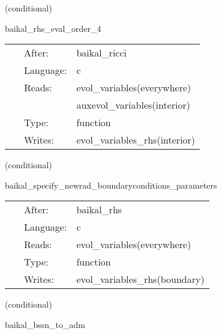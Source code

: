    (conditional) 

\hspace{5mm} baikal\_rhs\_eval\_order\_4 

\hspace{5mm}{\it evaluate bssn rhss, at finite-differencing order 4 } 


\hspace{5mm}

 \begin{tabular*}{160mm}{cll} 
~ & After:  & baikal\_ricci \\ 
~ & Language:  & c \\ 
~ & Reads:  & evol\_variables(everywhere) \\ 
~& ~ &auxevol\_variables(interior)\\ 
~ & Type:  & function \\ 
~ & Writes:  & evol\_variables\_rhs(interior) \\ 
\end{tabular*} 


\vspace{5mm}

   (conditional) 

\hspace{5mm} baikal\_specify\_newrad\_boundaryconditions\_parameters 

\hspace{5mm}{\it newrad boundary conditions, scheduled right after rhs eval. } 


\hspace{5mm}

 \begin{tabular*}{160mm}{cll} 
~ & After:  & baikal\_rhs \\ 
~ & Language:  & c \\ 
~ & Reads:  & evol\_variables(everywhere) \\ 
~ & Type:  & function \\ 
~ & Writes:  & evol\_variables\_rhs(boundary) \\ 
\end{tabular*} 


\vspace{5mm}

   (conditional) 

\hspace{5mm} baikal\_bssn\_to\_adm 

\hspace{5mm}{\it perform bssn-to-adm conversion. useful for diagnostics. } 



